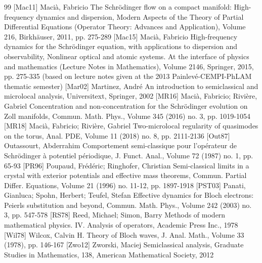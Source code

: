 \documentclass[10pt]{amsart}
\theoremstyle{definition}
\numberwithin{equation}{section}
\begin{document}
\begin{thebibliography}{99}
 [Mac11] Macià, Fabricio The Schrödinger flow on a compact manifold: High-frequency dynamics and dispersion, Modern Aspects of the Theory of Partial Differential Equations (Operator Theory: Advances and Application), Volume 216, Birkhäuser, 2011, pp. 275-289
 [Mac15] Macià, Fabricio High-frequency dynamics for the Schrödinger equation, with applications to dispersion and observability, Nonlinear optical and atomic systems. At the interface of physics and mathematics (Lecture Notes in Mathematics), Volume 2146, Springer, 2015, pp. 275-335 (based on lecture notes given at the 2013 Painlevé-CEMPI-PhLAM thematic semester)
 [Mar02] Martinez, André An introduction to semiclassical and microlocal analysis, Universitext, Springer, 2002
 [MR16] Macià, Fabricio; Rivière, Gabriel Concentration and non-concentration for the Schrödinger evolution on Zoll manifolds, Commun. Math. Phys., Volume 345 (2016) no. 3, pp. 1019-1054
 [MR18] Macià, Fabricio; Rivière, Gabriel Two-microlocal regularity of quasimodes on the torus, Anal. PDE, Volume 11 (2018) no. 8, pp. 2111-2136
 [Out87] Outassourt, Abderrahim Comportement semi-classique pour l’opérateur de Schrödinger à potentiel périodique, J. Funct. Anal., Volume 72 (1987) no. 1, pp. 65-93
 [PR96] Poupaud, Frédéric; Ringhofer, Christian Semi-classical limits in a crystal with exterior potentials and effective mass theorems, Commun. Partial Differ. Equations, Volume 21 (1996) no. 11-12, pp. 1897-1918
 [PST03] Panati, Gianluca; Spohn, Herbert; Teufel, Stefan Effective dynamics for Bloch electrons: Peierls substitution and beyond, Commun. Math. Phys., Volume 242 (2003) no. 3, pp. 547-578
 [RS78] Reed, Michael; Simon, Barry Methods of modern mathematical physics. IV. Analysis of operators, Academic Press Inc., 1978
 [Wil78] Wilcox, Calvin H. Theory of Bloch waves, J. Anal. Math., Volume 33 (1978), pp. 146-167
 [Zwo12] Zworski, Maciej Semiclassical analysis, Graduate Studies in Mathematics, 138, American Mathematical Society, 2012
\end{thebibliography}
\end{document}

